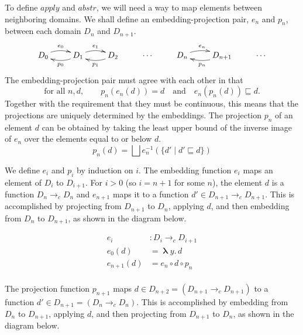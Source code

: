 \documentclass{tufte-handout}
\newcommand{\MLAM}[1]{\boldsymbol\uplambda #1.\,}
\begin{document}
To define $\mathit{apply}$ and $\mathit{abstr}$, we will need a way to
map elements between neighboring domains. We shall define an
embedding-projection pair, $e_n$ and $p_n$, between each domain $D_n$
and $D_{n+1}$.
\[
\xymatrix{
  D_0 \ar@/^/[r]^{e_0} & D_1 \ar@/^/[l]^{p_0} \ar@/^/[r]^{e_1} 
      & D_2 \ar@/^/[l]^{p_1} & \cdots &
  D_n \ar@/^/[r]^{e_n} & D_{n+1} \ar@/^/[l]^{p_n} & \cdots
}
\]
The embedding-projection pair must agree with each other in
that
\[
\text{for all } n, d, \qquad 
p_n(e_n(d)) = d \quad\text{and}\quad
e_n(p_n(d)) \sqsubseteq d.
\]
Together with the requirement that they must be continuous, this means
that the projections are uniquely determined by the embeddings.  The
projection $p_n$ of an element $d$ can be obtained by taking the least
upper bound of the inverse image of $e_n$ over the elements equal to
or below $d$.
\[
   p_n(d) = \bigsqcup e^{-1}_n(\{ d' \mid d' \sqsubseteq d \})
\]

We define $e_i$ and $p_i$ by induction on $i$. The embedding function
$e_i$ maps an element of $D_i$ to $D_{i+1}$. For $i > 0$ (so $i=n+1$
for some $n$), the element $d$ is a function $D_n \to_c D_n$ and
$e_{n+1}$ maps it to a function $d' \in D_{n+1} \to_c D_{n+1}$. This
is accomplished by projecting from $D_{n+1}$ to $D_n$, applying $d$,
and then embedding from $D_n$ to $D_{n+1}$, as shown in the diagram
below.

\begin{center}
\begin{minipage}{0.5\textwidth}
\begin{align*}
  e_i &: D_i \to_c D_{i+1} \\
  e_0 (d) &= \MLAM{y} d \\
  e_{n+1}(d) &= e_n \circ d \circ p_n \\
\end{align*}
\end{minipage}
\begin{minipage}{0.5\textwidth}
\end{minipage} 
\end{center}

The projection function $p_{n+1}$ maps $d \in D_{n+2} = (D_{n+1} \to_c
D_{n+1})$ to a function $d' \in D_{n+1} = (D_n \to_c D_n)$. This is
accomplished by embedding from $D_n$ to $D_{n+1}$, applying $d$, and
then projecting from $D_{n+1}$ to $D_n$, as shown in the diagram
below.
\end{document}

